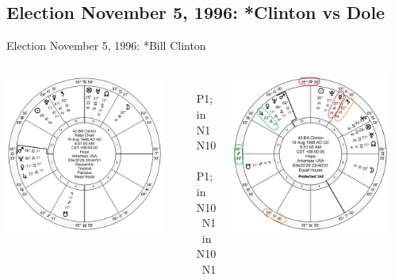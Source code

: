 \subsection{Election November 5, 1996: *Clinton vs Dole}
\begin{frame}[t]{Election November 5, 1996: *Bill Clinton}
\small

\begin{columns}[T, onlytextwidth]
\vspace{-1em}
{\includegraphics[width=0.9\textwidth]{charts/Clinton.png}}
\fontsize{8pt}{9pt}\selectfont

\Jupiter\, \Sextile\, P1; in N1 \Square\, N10 \\
\Mercury\, \Trine\, P1; in N10 \Sextile\, N1 \\
\Saturn\, in N10 \Sextile\, N1

\vspace{-1em}
{\includegraphics[width=0.9\textwidth]{charts/Clinton-Prof-3rd.png}}
\fontsize{8pt}{9pt}\selectfont


\end{columns}
\end{frame}
